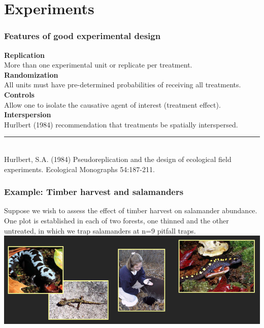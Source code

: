 \documentclass[color=usenames,dvipsnames]{beamer}\usepackage[]{graphicx}\usepackage[]{color}
\begin{document}
\section{Experiments}


\begin{frame}
  \frametitle{Features of good experimental design}
  {\bf Replication} \\
  More than one experimental unit or replicate per treatment. \\
  \pause
  \vfill
  {\bf Randomization} \\
  All units must have pre-determined probabilities of receiving all
  treatments. \\ %
  \pause
  \vfill
  {\bf Controls} \\
  Allow one to isolate the causative agent of interest (treatment
  effect). \\ %
  \pause
  \vfill
  {\bf Interspersion} \\
  Hurlbert (1984) recommendation that treatments be spatially interspersed.  \\
  \vspace{1pt}
  \rule[0mm]{1cm}{0.1mm} \\
  \footnotesize
  Hurlbert, S.A. (1984) Pseudoreplication and the design of ecological field
  experiments.  Ecological Monographs 54:187-211.
\end{frame}



\begin{frame}
  \frametitle{Example: Timber harvest and salamanders}
  Suppose we wish to assess the effect of timber harvest on salamander
  abundance.  One plot is established in each of two forests, one
  thinned and the other untreated, in which we trap salamanders at n=9
  pitfall traps.  %
  \vfill
  \centering
  \includegraphics[width=\textwidth]{salamanders} \\
\end{frame}
\end{document}

